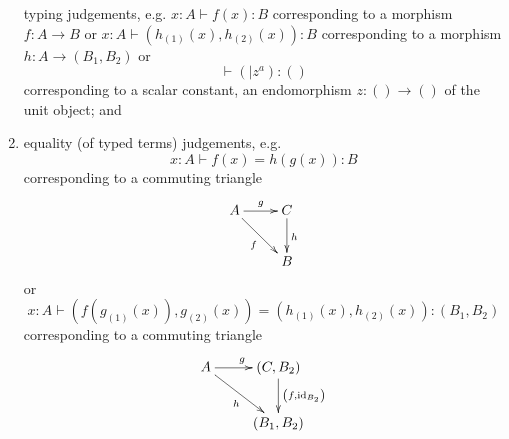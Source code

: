 \documentclass[pra,floatfix,
amsmath,superscriptaddress, 12pt]{article}
\theoremstyle{definition}
\newcommand{\fF}{\mathfrak{F}}
\newcommand{\cG}{\mathcal{G}}
\newcommand{\mc}[1]{\mathcal{#1}}
\DeclareMathOperator{\id}{{\normalfont\text{id}}}
\begin{document}
\begin{enumerate}
 
typing judgements, e.g. 
$x:A\vdash f\left(x\right):B$
corresponding to a morphism $f:A\longrightarrow B$ or
$ x:A\vdash\left(h_{\left(1\right)}\left(x\right),h_{\left(2\right)}\left(x\right)\right):B$
 corresponding to a morphism $h:A\longrightarrow\left(B_{1},B_{2}\right)$
or 
\[
\vdash\left(|z^{a}\right):\left(\right)
\]
 corresponding to a scalar constant, an endomorphism $z:\left(\right)\longrightarrow\left(\right)$
of the unit object; and
\item equality (of typed terms) judgements, e.g. 
\[
x:A\vdash f\left(x\right)=h\left(g\left(x\right)\right):B
\]
corresponding to a commuting triangle 
\[
\xymatrix{A\ar[r]^{g}\ar[dr]_{f} & C\ar[d]^{h}\\
 & B
}
\]
or 
\[
x:A\vdash\left(f\left(g_{\left(1\right)}\left(x\right)\right),g_{\left(2\right)}\left(x\right)\right)=\left(h_{\left(1\right)}\left(x\right),h_{\left(2\right)}\left(x\right)\right):\left(B_{1},B_{2}\right)
\]
corresponding to a commuting triangle
\[
\xymatrix{A\ar[r]^{g}\ar[dr]_{h} & \left(C,B_{2}\right)\ar[d]^{\left(f,\id_{B_{2}}\right)}\\
 & \left(B_{1},B_{2}\right)
}
\]
 
\end{enumerate}	
		
\end{document}
